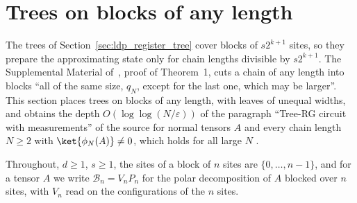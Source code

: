 
\section{Trees on blocks of any length}
\label{sec:ldp_unequal_trees}

The trees of Section~\ref{sec:ldp_register_tree} cover blocks of $s2^{k+1}$
sites, so they prepare the approximating state only for chain lengths divisible
by $s2^{k+1}$. The Supplemental Material of~\cite{Malz2024Preparation}, proof
of Theorem~1, cuts a chain of any length into blocks ``all of the same size,
$q_N$, except for the last one, which may be larger''. This section places trees
on blocks of any length, with leaves of unequal widths, and obtains the depth
$O(\log\log(N/\varepsilon))$ of the paragraph ``Tree-RG circuit with
measurements'' of the source for normal tensors $A$ and every chain length
$N\ge2$ with $\ket{\phi_N(A)}\neq0$, which holds for all large $N$
\cite{gap:mswc24_tree_measurement_scope}.

Throughout, $d\ge1$, $s\ge1$, the sites of a block of $n$ sites are
$\{0,\dots,n-1\}$, and for a tensor $A$ we write $\mathcal B_n=V_nP_n$ for the
polar decomposition of $A$ blocked over $n$ sites, with $V_n$ read on the
configurations of the $n$ sites.

